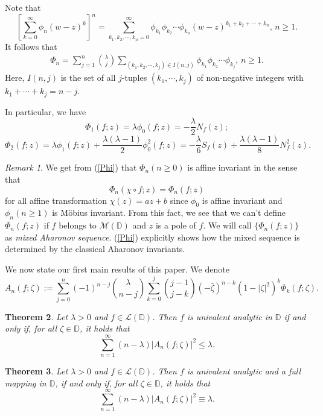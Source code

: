 \documentclass[10pt]{amsart}
\newtheorem{theorem}{Theorem}[section]
\theoremstyle{definition}
\theoremstyle{remark}
\newtheorem{remark}[theorem]{Remark}
\numberwithin{equation}{section}
\begin{document}
Note that 
\begin{equation}
 \left[\sum_{k=0}^{\infty}\phi_n(w-z)^{k}\right]^{n}=\sum_{k_1, k_2, \cdots, k_n=0}^{\infty}\phi_{k_1}\phi_{k_2}\cdots\phi_{k_n}(w-z)^{k_1+k_2+\cdots+k_n},\, n\geq 1. \nonumber
\end{equation}
It follows that 
\begin{eqnarray}\label{Phi}
\Phi_n=\sum_{j=1}^{n}\binom{\lambda}{j} \sum_{(k_1, k_2, \cdots, k_j)\in I(n,j)}\phi_{k_1}\phi_{k_2}\cdots\phi_{k_j},\, n\geq 1. \end{eqnarray}
Here, $I(n,j)$ is the set of all $j$-tuples $(k_1,\cdots, k_j)$ of non-negative integers with $k_1+\cdots+k_j=n-j$. 

In particular,  we have $$\Phi_1(f; z)=\lambda \phi_0(f; z)=-\frac{\lambda}{2}N_f(z);$$
$$\Phi_2(f; z)=\lambda \phi_1(f; z)+\frac{\lambda(\lambda-1)}{2}\phi_0^2(f; z)=-\frac{\lambda}{6}S_f(z)+\frac{\lambda(\lambda-1)}{8}N_f^2(z).$$

\begin{remark}We get from (\ref{Phi}) that $\Phi_n(n\geq 0)$ is affine invariant in the sense that 
$$\Phi_n(\chi \circ f; z)= \Phi_n(f; z)$$
for all affine transformation $\chi(z)=az+b$ since $\phi_0$ is  affine invariant and $\phi_n(n\geq 1)$ is M\"obius invariant. 
From this fact, we see that we can't define $\Phi_n(f; z)$ if $f$ belongs to $\mathcal{M}(\mathbb{D})$ and $z$ is a pole of $f$. We will call $\{\Phi_n(f; z)\}$ as {\em  mixed Aharonov sequence}. (\ref{Phi}) explicitly shows how the mixed sequence is determined by the classical Aharonov invariants.
\end{remark}

We now state our first main results of this paper. We denote
$$A_n(f; \zeta):=\sum_{j=0}^{n}(-1)^{n-j}\binom{\lambda}{n-j}\sum_{k=0}^{j}\binom{j-1}{j-k}(-\bar{\zeta})^{n-k}(1-|\zeta|^2)^{k}\Phi_{k}(f; \zeta).$$

\begin{theorem}\label{main-1}
Let $\lambda>0$ and $f \in \mathcal{L}(\mathbb{D})$. Then $f$ is univalent analytic in $\mathbb{D}$ if and only if, for all $\zeta\in \mathbb{D}$, it holds that
\begin{equation}\label{m-ine-1}
\sum_{n=1}^{\infty}(n-\lambda)\left|A_n(f; \zeta)\right|^2\leq \lambda.
\end{equation}
\end{theorem}

\begin{theorem}\label{main-2}
Let $\lambda>0$ and $f \in \mathcal{L}(\mathbb{D})$. Then $f$ is univalent analytic and a full mapping in $\mathbb{D}$, if and only if,  for all $\zeta\in \mathbb{D}$, it holds that
\begin{equation}\label{m-ine-2}
\sum_{n=1}^{\infty}(n-\lambda)\left|A_n(f; \zeta)\right|^2\equiv \lambda.
\end{equation}
\end{theorem}
\end{document}
